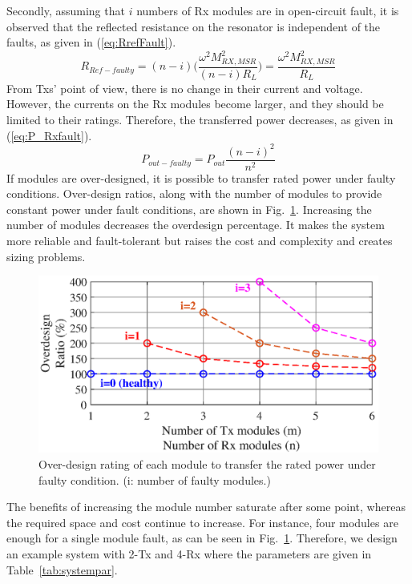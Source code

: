 \documentclass[journal]{IEEEtran}
\begin{document}
Secondly, assuming that $i$ numbers of Rx modules are in open-circuit fault, 
it is observed that the reflected resistance on the resonator is independent of the faults, as given in (\ref{eq:RrefFault}).
\begin{equation}
\label{eq:RrefFault}
    R_{Ref-faulty}= (n-i)\Bigg(\frac{\omega^2M_{RX,MSR}^2}{(n-i)R_L} \Bigg) = \frac{\omega^2M_{RX,MSR}^2}{R_L} 
\end{equation}
From Txs' point of view, there is no change in their current and voltage. 
However, the currents on the Rx modules become larger, and they should be limited to their ratings.
Therefore, the transferred power decreases, as given in (\ref{eq:P_Rxfault}).
\begin{equation}
\label{eq:P_Rxfault}
    P_{out-faulty}= P_{out}\frac{(n-i)^2}{n^2}
\end{equation}
If modules are over-designed, it is possible to transfer rated power under faulty conditions.
Over-design ratios, along with the number of modules to provide constant power under fault conditions, are shown in Fig.~\ref{fig:modularity}. 
Increasing the number of modules decreases the overdesign percentage. It makes the system more reliable and fault-tolerant but raises the cost and complexity and creates sizing problems.
 \begin{figure}[h]
 \centering
\includegraphics[width=1\linewidth]{overdesing_ratio1.eps}
\caption{ Over-design rating of each module to transfer the rated power under faulty condition. (i: number of faulty modules.)}
\label{fig:modularity}
\end{figure}

The benefits of increasing the module number saturate after some point, whereas the required space and cost continue to increase. For instance, four modules are enough for a single module fault, as can be seen in Fig.~\ref{fig:modularity}. Therefore, we design an example system with 2-Tx and 4-Rx  where the parameters are given in Table~\ref{tab:systempar}. 
\end{document}
